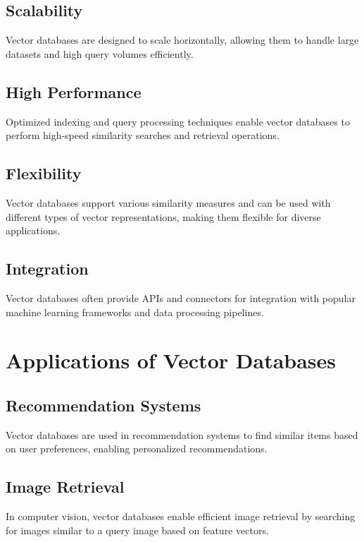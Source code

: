 \subsection{Scalability}
Vector databases are designed to scale horizontally, allowing them to handle large datasets and high query volumes efficiently.

\subsection{High Performance}
Optimized indexing and query processing techniques enable vector databases to perform high-speed similarity searches and retrieval operations.

\subsection{Flexibility}
Vector databases support various similarity measures and can be used with different types of vector representations, making them flexible for diverse applications.

\subsection{Integration}
Vector databases often provide APIs and connectors for integration with popular machine learning frameworks and data processing pipelines.

\section{Applications of Vector Databases}

\subsection{Recommendation Systems}
Vector databases are used in recommendation systems to find similar items based on user preferences, enabling personalized recommendations.

\subsection{Image Retrieval}
In computer vision, vector databases enable efficient image retrieval by searching for images similar to a query image based on feature vectors.

